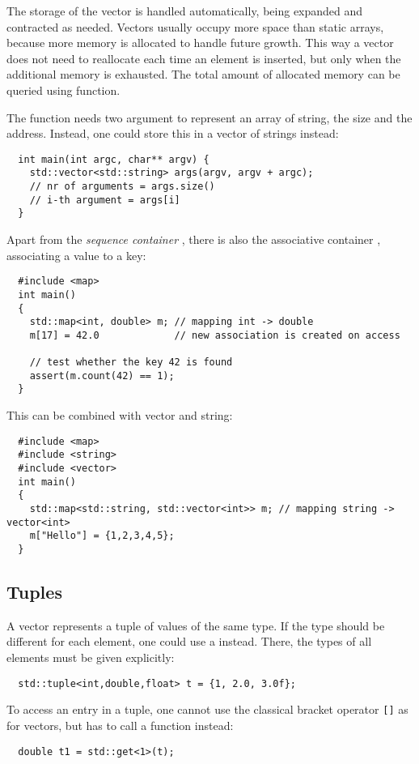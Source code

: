 The storage of the vector is handled automatically, being expanded and contracted as needed. Vectors usually occupy more space than static arrays, because more memory is allocated to handle future growth. This way a vector does not need to reallocate each time an element is inserted, but only when the additional memory is exhausted. The total amount of allocated memory can be queried using  function.

\begin{rem}
  The  function needs two argument to represent an array of string, the size and the address. Instead, one could
  store this in a vector of strings instead:
  \begin{verbatim}
  int main(int argc, char** argv) {
    std::vector<std::string> args(argv, argv + argc);
    // nr of arguments = args.size()
    // i-th argument = args[i]
  }
  \end{verbatim}
\end{rem}

Apart from the \emph{sequence container} , there is also the associative container , associating a value to a key:
\begin{verbatim}
  #include <map>
  int main()
  {
    std::map<int, double> m; // mapping int -> double
    m[17] = 42.0             // new association is created on access

    // test whether the key 42 is found
    assert(m.count(42) == 1);
  }
\end{verbatim}

This can be combined with vector and string:
\begin{verbatim}
  #include <map>
  #include <string>
  #include <vector>
  int main()
  {
    std::map<std::string, std::vector<int>> m; // mapping string -> vector<int>
    m["Hello"] = {1,2,3,4,5};
  }
\end{verbatim}

\subsection{Tuples}
A vector represents a tuple of values of the same type. If the type should be
different for each element, one could use a  instead. There, the types of all elements must be given
explicitly:
%
\begin{verbatim}
  std::tuple<int,double,float> t = {1, 2.0, 3.0f};
\end{verbatim}
%
To access an entry in a tuple, one cannot use the classical bracket operator \texttt{[]} as for vectors, but has to call a
function instead:
%
\begin{verbatim}
  double t1 = std::get<1>(t);
\end{verbatim}

